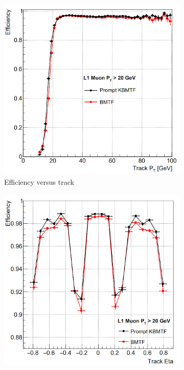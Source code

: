 \begin{figure}[htb!]
	\centering
	\captionsetup[subfigure]{justification=centering}
	\begin{subfigure}[h]{0.45\linewidth}
		\includegraphics[width=\linewidth]{figs/04_muons/effVsPt_kmtf.png}
		\caption{Efficiency versus track \pt}
		\label{fig:effVsPt}
	\end{subfigure}
	\begin{subfigure}[h]{0.45\linewidth}
		\includegraphics[width=\linewidth]{figs/04_muons/effVsEta_kmtf.png}

\end{subfigure}
\end{figure}
